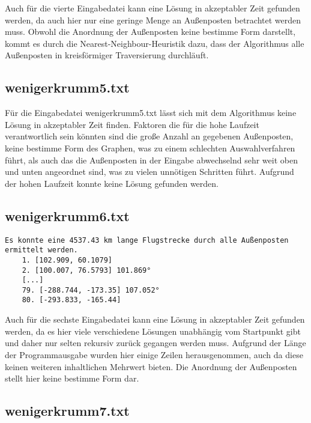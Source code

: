 \documentclass[a4paper,10pt,ngerman]{scrartcl}
\begin{document}
    Auch für die vierte Eingabedatei kann eine Lösung in akzeptabler Zeit gefunden werden,
    da auch hier nur eine geringe Menge an Außenposten betrachtet werden muss.
    Obwohl die Anordnung der Außenposten keine bestimme Form darstellt,
    kommt es durch die Nearest-Neighbour-Heuristik dazu, dass der Algorithmus alle Außenposten in kreisförmiger Traversierung durchläuft.


    \subsection{wenigerkrumm5.txt}\label{subsec:wenigerkrumm5.txt}

    Für die Eingabedatei wenigerkrumm5.txt lässt sich mit dem Algorithmus keine Lösung in akzeptabler Zeit finden.
    Faktoren die für die hohe Laufzeit verantwortlich sein könnten sind die große Anzahl an gegebenen Außenposten,
    keine bestimme Form des Graphen, was zu einem schlechten Auswahlverfahren führt,
    als auch das die Außenposten in der Eingabe abwechselnd sehr weit oben und unten angeordnet sind,
    was zu vielen unnötigen Schritten führt.
    Aufgrund der hohen Laufzeit konnte keine Lösung gefunden werden.

    \subsection{wenigerkrumm6.txt}\label{subsec:wenigerkrumm6.txt}


    \begin{lstlisting}[frame=single, title=Programmausgabe wenigerkrumm6.txt, breaklines=true,label={lst:lstlisting4}]
    Es konnte eine 4537.43 km lange Flugstrecke durch alle Außenposten ermittelt werden.
    1. [102.909, 60.1079]
    2. [100.007, 76.5793] 101.869°
    [...]
    79. [-288.744, -173.35] 107.052°
    80. [-293.833, -165.44]
    \end{lstlisting}

    Auch für die sechste Eingabedatei kann eine Lösung in akzeptabler Zeit gefunden werden,
    da es hier viele verschiedene Lösungen unabhängig vom Startpunkt gibt und daher nur selten rekursiv zurück gegangen werden muss.
    Aufgrund der Länge der Programmausgabe wurden hier einige Zeilen herausgenommen, auch da diese keinen weiteren inhaltlichen Mehrwert bieten.
    Die Anordnung der Außenposten stellt hier keine bestimme Form dar.

    \subsection{wenigerkrumm7.txt}\label{subsec:wenigerkrumm7.txt}
\end{document}
